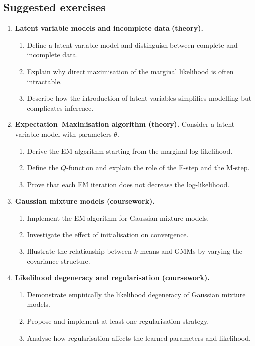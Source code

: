 \subsection{Suggested exercises}

\begin{enumerate}
    \item \textbf{Latent variable models and incomplete data (theory).}  
    \begin{enumerate}
        \item Define a latent variable model and distinguish between complete and incomplete data.
        \item Explain why direct maximisation of the marginal likelihood is often intractable.
        \item Describe how the introduction of latent variables simplifies modelling but complicates inference.
    \end{enumerate}

    \item \textbf{Expectation–Maximisation algorithm  (theory).}  
    Consider a latent variable model with parameters $\theta$.
    \begin{enumerate}
        \item Derive the EM algorithm starting from the marginal log-likelihood.
        \item Define the $Q$-function and explain the role of the E-step and the M-step.
        \item Prove that each EM iteration does not decrease the log-likelihood.
    \end{enumerate}
    \item \textbf{Gaussian mixture models (coursework).}  
    \begin{enumerate}
        \item Implement the EM algorithm for Gaussian mixture models.
        \item Investigate the effect of initialisation on convergence.
        \item Illustrate the relationship between $k$-means and GMMs by varying the covariance structure.
    \end{enumerate}

    \item \textbf{Likelihood degeneracy and regularisation (coursework).}  
    \begin{enumerate}
        \item Demonstrate empirically the likelihood degeneracy of Gaussian mixture models.
        \item Propose and implement at least one regularisation strategy.
        \item Analyse how regularisation affects the learned parameters and likelihood.
    \end{enumerate}
\end{enumerate}

